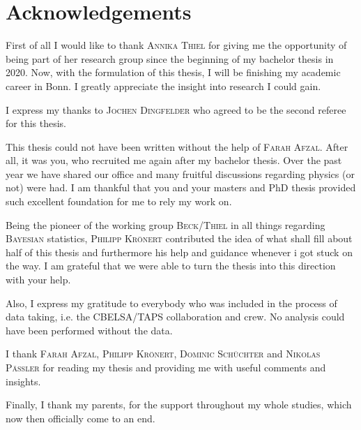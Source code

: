 \chapter*{Acknowledgements}
\label{sec:ack}

\noindent First of all I would like to thank \textsc{Annika Thiel} for giving me the opportunity of being part of her research group since the beginning of my bachelor thesis in 2020. Now, with the formulation of this thesis, I will be finishing my academic career in Bonn. I greatly appreciate the insight into research I could gain.
\vspace{1cm}

\noindent I express my thanks to \textsc{Jochen Dingfelder} who agreed to be the second referee for this thesis.
\vspace{1cm}

\noindent This thesis could not have been written without the help of \textsc{Farah Afzal}. After all, it was you, who recruited me again after my bachelor thesis. Over the past year we have shared our office and many fruitful discussions regarding physics (or not) were had. I am thankful that you and your masters and PhD thesis provided such excellent foundation for me to rely my work on.
\vspace{1cm}

\noindent Being the pioneer of the working group \textsc{Beck/Thiel} in all things regarding \textsc{Bayesian} statistics, \textsc{Philipp Krönert} contributed the idea of what shall fill about half of this thesis and furthermore his help and guidance whenever i got stuck on the way. I am grateful that we were able to turn the thesis into this direction with your help.
\vspace{1cm}

\noindent Also, I express my gratitude to everybody who was included in the process of data taking, i.e. the CBELSA/TAPS collaboration and crew. No analysis could have been performed without the data.
\vspace{1cm}

\noindent I thank \textsc{Farah Afzal, Philipp Krönert, Dominic Schüchter} and \textsc{Nikolas Pässler} for reading my thesis and providing me with useful comments and insights.
\vspace{1cm}

\noindent Finally, I thank my parents, for the support throughout my whole studies, which now then officially come to an end. 

   


